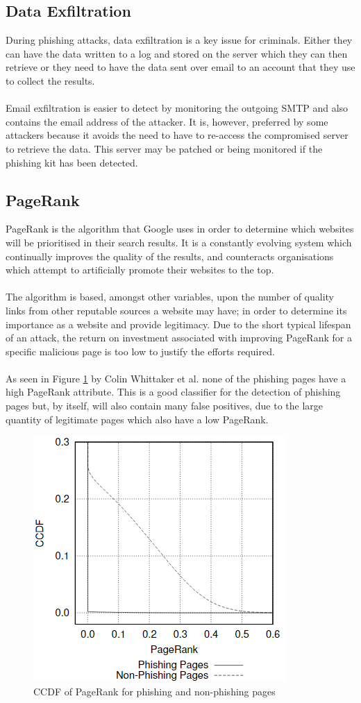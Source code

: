 \documentclass[12pt,twoside]{report}
\begin{document}
\subsection{Data Exfiltration}
During phishing attacks, data exfiltration is a key issue for criminals. Either they can have the data written to a log and stored on the server which they can then retrieve or they need to have the data sent over email to an account that they use to collect the results.
\\\\
Email exfiltration is easier to detect by monitoring the outgoing SMTP and also contains the email address of the attacker. It is, however, preferred by some attackers because it avoids the need to have to re-access the compromised server to retrieve the data. This server may be patched or being monitored if the phishing kit has been detected. 

\subsection{PageRank}
PageRank is the algorithm that Google uses in order to determine which websites will be prioritised in their search results. It is a constantly evolving system which continually improves the quality of the results, and counteracts organisations which attempt to artificially promote their websites to the top.
\\\\
The algorithm is based, amongst other variables, upon the number of quality links from other reputable sources a website may have; in order to determine its importance as a website and provide legitimacy. Due to the short typical lifespan of an attack, the return on investment associated with improving PageRank for a specific malicious page is too low to justify the efforts required.
\\\\
As seen in Figure \ref{fig:pagerankphishing} by Colin Whittaker et al. none of the phishing pages have a high PageRank attribute\cite{largescaleautomatic}. This is a good classifier for the detection of phishing pages but, by itself, will also contain many false positives, due to the large quantity of legitimate pages which also have a low PageRank.
\begin{figure}[h]
  \begin{center}
    \includegraphics[width=0.5\linewidth]{images/pagerankphishing.png}
  \end{center}
  \caption{CCDF of PageRank for phishing and non-phishing pages~\cite{largescaleautomatic}}
  \label{fig:pagerankphishing}
\end{figure}
\end{document}
